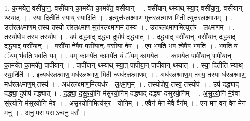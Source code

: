 \documentclass[17pt]{extarticle}
\begin{document}
1. का॒मये॑त॒ वसी॑या॒न्॒. वसी॑यान् का॒मये॑त का॒मये॑त॒ वसी॑यान् । . वसी॑यान् थ्स्याथ् स्या॒द् वसी॑या॒न्॒. वसी॑यान् थ्स्यात् । . स्या॒ दितीति॑ स्याथ् स्या॒दिति॑ । . इत्युत्त॑रलक्ष्माण॒ मुत्त॑रलक्ष्माण॒ मिती त्युत्त॑रलक्ष्माणम् । . उत्त॑रलक्ष्माण॒म् तस्य॒ तस्यो त्त॑रलक्ष्माण॒ मुत्त॑रलक्ष्माण॒म् तस्य॑ । . उत्त॑रलक्ष्माण॒मित्युत्त॑र - ल॒क्ष्मा॒ण॒म् । . तस्योपोप॒ तस्य॒ तस्योप॑ । . उप॑ दद्ध्याद् दद्ध्या॒ दुपोप॑ दद्ध्यात् । . द॒द्ध्या॒द् वसी॑या॒न्॒. वसी॑यान् दद्ध्याद् दद्ध्या॒द् वसी॑यान् । . वसी॑या ने॒वैव वसी॑या॒न्॒. वसी॑या ने॒व । . ए॒व भ॑वति भव त्ये॒वैव भ॑वति । . भ॒व॒ति॒ यं ॅयम् भ॑वति भवति॒ यम् । . यम् का॒मये॑त का॒मये॑त॒ यं ॅयम् का॒मये॑त । . का॒मये॑त॒ पापी॑या॒न् पापी॑यान् का॒मये॑त का॒मये॑त॒ पापी॑यान् । . पापी॑यान् थ्स्याथ् स्या॒त् पापी॑या॒न् पापी॑यान् थ्स्यात् । . स्या॒ दितीति॑ स्याथ् स्या॒दिति॑ । . इत्यध॑रलक्ष्माण॒ मध॑रलक्ष्माण॒ मिती त्यध॑रलक्ष्माणम् । . अध॑रलक्ष्माण॒म् तस्य॒ तस्या ध॑रलक्ष्माण॒ मध॑रलक्ष्माण॒म् तस्य॑ । . अध॑रलक्ष्माण॒मित्यध॑र - ल॒क्ष्मा॒ण॒म् । . तस्योपोप॒ तस्य॒ तस्योप॑ । . उप॑ दद्ध्याद् दद्ध्या॒ दुपोप॑ दद्ध्यात् । . द॒द्ध्या॒ द॒सु॒र॒यो॒नि म॑सुरयो॒निम् द॑द्ध्याद् दद्ध्या दसुरयो॒निम् । . अ॒सु॒र॒यो॒नि मे॒वैवा सु॑रयो॒नि म॑सुरयो॒नि मे॒व । . अ॒सु॒र॒यो॒निमित्य॑सुर - यो॒निम् । . ए॒वैन॑ मेन मे॒वै वैन᳚म् । . ए॒न॒ मन् वन् वे॑न मेन॒ मनु॑ । . अनु॒ परा॒ परा ऽन्वनु॒ परा᳚ । \newline
\end{document}
